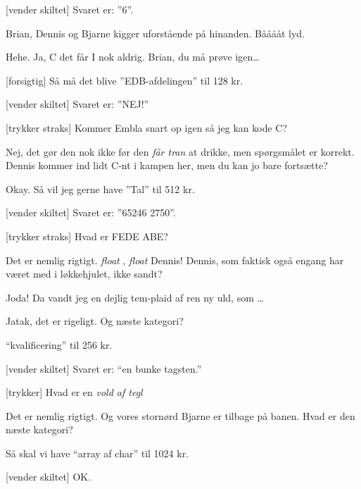 \documentclass[danish]{article}
\begin{document}
\begin{sketch}
[vender skiltet] Svaret er: ''6''.

\scene Brian, Dennis og Bjarne kigger uforstående på hinanden. Bååååt lyd.

 Hehe. Ja, C det får I nok aldrig. Brian, du må prøve
igen\ldots{}

[forsigtig] Så må det blive ''EDB-afdelingen'' til 128 kr.

[vender skiltet] Svaret er: ''NEJ!''

[trykker straks] Kommer Embla snart op igen så jeg kan
kode C?

 Nej, det gør den nok ikke før den \emph{får tran} at drikke,
men spørgsmålet er korrekt. Dennis kommer ind lidt C-nt i
kampen her, men du kan jo bare fortsætte?

 Okay. Så vil jeg gerne have ''Tal'' til 512 kr.

[vender skiltet] Svaret er: ''65246 2750''.

[trykker straks] Hvad er FEDE ABE?

 Det er nemlig rigtigt.  \emph{float} , \emph{float} Dennis!
Dennis, som faktisk også engang har været med i løkkehjulet, ikke sandt?

 Joda!  Da vandt jeg en dejlig tem-plaid af ren ny uld, som \ldots{} 

 Jatak, det er rigeligt. Og næste kategori?

%
%
%
%
%
%
%
%

 ``kvalificering'' til 256 kr.

[vender skiltet] Svaret er: ``en bunke tagsten.''

[trykker] Hvad er en \emph{vold af tegl} 

 Det er nemlig rigtigt. Og vores stornørd Bjarne er
tilbage på banen.
Hvad er den næste kategori?

 Så skal vi have ``array af char'' til 1024 kr.

[vender skiltet] OK.


\end{sketch}
\end{document}
